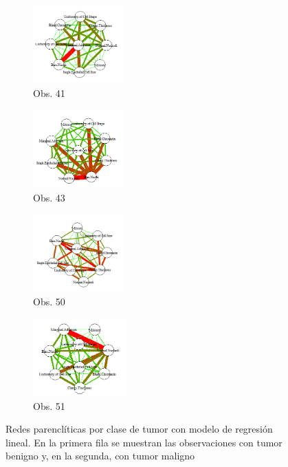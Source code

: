 \begin{figure}[htbp!]
\begin{center}
		\begin{subfigure}[t]{0.2\textwidth}
			\centering
			\includegraphics[height=3cm]{imagenes/cancer/m1.png}
			\caption{Obs. 41}
		\end{subfigure}
		\begin{subfigure}[t]{0.2\textwidth}
			\centering
			\includegraphics[height=3cm]{imagenes/cancer/m2.png}
			\caption{Obs. 43}
		\end{subfigure}
		\begin{subfigure}[t]{0.2\textwidth}
			\centering
			\includegraphics[height=3cm]{imagenes/cancer/m3.png}
			\caption{Obs. 50}
		\end{subfigure}
		\begin{subfigure}[t]{0.2\textwidth}
			\centering
			\includegraphics[height=3cm]{imagenes/cancer/m4.png}
			\caption{Obs. 51}
		\end{subfigure}		
	\end{center}
	\caption[Redes parenclíticas por clase de tumor con modelo de regresión lineal]{Redes parenclíticas por clase de tumor con modelo de regresión lineal. En la primera fila se muestran las observaciones con tumor benigno y, en la segunda, con tumor maligno}
	\label{fig:cancer_diferencias}
\end{figure}

